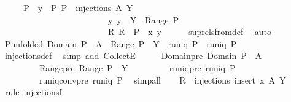 \begin{isabellebody}
\ \ \isamarkupfalse%
\ \isamarkupfalse%
\ P\ \ y\ \ P{\isacharcolon}\ {\isachardoublequoteopen}P\ {\isasymin}\ injections\ A\ Y{\isachardoublequoteclose}\isanewline
\ \ \ \ \ \ \ \ \ \ \ \ \ \ \ \ \ \ \ \ \ \ \ \ \ y{\isacharcolon}\ {\isachardoublequoteopen}y\ {\isasymin}\ Y\ {\isacharminus}\ Range\ P{\isachardoublequoteclose}\isanewline
\ \ \ \ \ \ \ \ \ \ \ \ \ \ \ \ \ \ \ \ \ \ \ \ \ R{\isacharcolon}\ {\isachardoublequoteopen}R\ {\isacharequal}\ P\ {\isacharplus}{\isacharasterisk}\ {\isacharbraceleft}{\isacharparenleft}x{\isacharcomma}\ y{\isacharparenright}{\isacharbraceright}{\isachardoublequoteclose}\isanewline
\ \ \ \ \isamarkupfalse%
\ sup{\isacharunderscore}rels{\isacharunderscore}from{\isacharunderscore}def\ \isamarkupfalse%
\ auto\isanewline
\ \ \isamarkupfalse%
\ \isamarkupfalse%
\ P{\isacharunderscore}unfolded{\isacharcolon}\ {\isachardoublequoteopen}Domain\ P\ {\isacharequal}\ A\ {\isasymand}\ Range\ P\ {\isasymsubseteq}\ Y\ {\isasymand}\ runiq\ P\ {\isasymand}\ runiq\ {\isacharparenleft}P{\isasyminverse}{\isacharparenright}{\isachardoublequoteclose}\isanewline
\ \ \ \ \isamarkupfalse%
\ injections{\isacharunderscore}def\ \isamarkupfalse%
\ {\isacharparenleft}simp\ add{\isacharcolon}\ CollectE{\isacharparenright}\isanewline
\ \ \isamarkupfalse%
\ \isamarkupfalse%
\ Domain{\isacharunderscore}pre{\isacharcolon}\ {\isachardoublequoteopen}Domain\ P\ {\isacharequal}\ A{\isachardoublequoteclose}\isanewline
\ \ \ \ \ \ \ \ \ Range{\isacharunderscore}pre{\isacharcolon}\ {\isachardoublequoteopen}Range\ P\ {\isasymsubseteq}\ Y{\isachardoublequoteclose}\isanewline
\ \ \ \ \ \ \ \ \ runiq{\isacharunderscore}pre{\isacharcolon}\ {\isachardoublequoteopen}runiq\ P{\isachardoublequoteclose}\isanewline
\ \ \ \ \ \ \ \ \ runiq{\isacharunderscore}conv{\isacharunderscore}pre{\isacharcolon}\ {\isachardoublequoteopen}runiq\ {\isacharparenleft}P{\isasyminverse}{\isacharparenright}{\isachardoublequoteclose}\ \isamarkupfalse%
\ simp{\isacharunderscore}all\isanewline
\isanewline
\ \ \isamarkupfalse%
\ {\isachardoublequoteopen}R\ {\isasymin}\ injections\ {\isacharparenleft}insert\ x\ A{\isacharparenright}\ Y{\isachardoublequoteclose}\isanewline
\ \ \isamarkupfalse%
\ {\isacharparenleft}rule\ injectionsI{\isacharparenright}\isanewline

\end{isabellebody}
